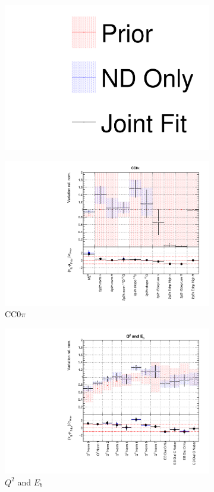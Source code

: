 \begin{figure}[!htbp]
\centering
\begin{subfigure}{0.8\textwidth}
  \centering
  \includegraphics[width=0.24\linewidth]{figs/joint_leg}
\end{subfigure}
\begin{subfigure}{0.49\textwidth}
  \centering
  \includegraphics[width=0.9\linewidth]{figs/jointxsec1}
  \caption{CC0$\pi$}
\end{subfigure}
\begin{subfigure}{0.49\textwidth}
  \centering
  \includegraphics[width=0.9\linewidth]{figs/jointxsec2}
  \caption{$Q^2$ and $E_b$}
\end{subfigure}
\begin{subfigure}{0.49\textwidth}

\end{subfigure}
\end{figure}
